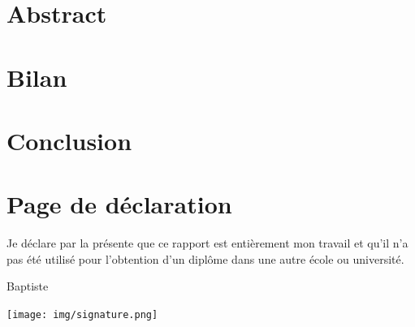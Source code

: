 \documentclass{article}
\begin{document}
    \section{Abstract}


    

    

    

    

    

    

    

    \section{Bilan}

    \section{Conclusion}

    \clearpage

    \section{Page de déclaration}

    \vspace{\fill}

    Je déclare par la présente que ce rapport est entièrement mon travail et qu'il n'a pas été utilisé pour l'obtention d'un diplôme dans une autre école ou université.

    \vspace{3cm}

    \hspace{\fill}Baptiste 

    \hspace{\fill}\texttt{[image: img/signature.png]}

    \vspace{\fill}
\end{document}
